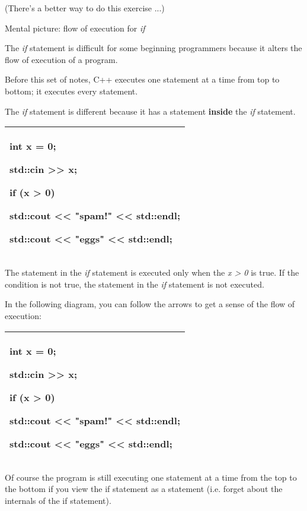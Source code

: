 \documentclass[
]{article}
\begin{document}
(There's a better way to do this exercise ...)

Mental picture: flow of execution for \emph{if}

The \emph{if} statement is difficult for some beginning programmers
because it alters the flow of execution of a program.

Before this set of notes, C++ executes one statement at a time from top
to bottom; it executes every statement.

The \emph{if} statement is different because it has a statement
\textbf{inside} the \emph{if} statement.

\begin{longtable}[]{@{}l@{}}
\toprule
\endhead
\begin{minipage}[t]{0.97\columnwidth}\raggedright
int x = 0;

std::cin \textgreater\textgreater{} x;

if (x \textgreater{} 0)

std::cout \textless\textless{} "spam!" \textless\textless{} std::endl;

std::cout \textless\textless{} "eggs" \textless\textless{}
std::endl;\strut
\end{minipage}\tabularnewline
\bottomrule
\end{longtable}

The statement in the \emph{if} statement is executed only when the
\emph{x \textgreater{} 0} is true. If the condition is not true, the
statement in the \emph{if} statement is not executed.

In the following diagram, you can follow the arrows to get a sense of
the flow of execution:

\begin{longtable}[]{@{}l@{}}
\toprule
\endhead
\begin{minipage}[t]{0.97\columnwidth}\raggedright
int x = 0;

std::cin \textgreater\textgreater{} x;

if (x \textgreater{} 0)

std::cout \textless\textless{} "spam!" \textless\textless{} std::endl;

std::cout \textless\textless{} "eggs" \textless\textless{}
std::endl;\strut
\end{minipage}\tabularnewline
\bottomrule
\end{longtable}

Of course the program is still executing one statement at a time from
the top to the bottom if you view the if statement as a statement (i.e.
forget about the internals of the if statement).
\end{document}
